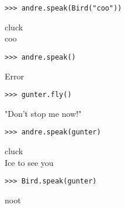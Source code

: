 \newpage
\begin{blocksection}
\vspace{9\baselineskip}
\begin{lstlisting}
>>> andre.speak(Bird("coo"))
\end{lstlisting}
\begin{solution}[.2in]
cluck \\
coo
\end{solution}

\vspace{3\baselineskip}
\begin{lstlisting}
>>> andre.speak()
\end{lstlisting}
\begin{solution}[.2in]
Error
\end{solution}

\vspace{3\baselineskip}
\begin{lstlisting}
>>> gunter.fly()
\end{lstlisting}
\begin{solution}[.2in]
"Don't stop me now!"
\end{solution}

\vspace{3\baselineskip}
\begin{lstlisting}
>>> andre.speak(gunter)
\end{lstlisting}
\begin{solution}[.2in]
cluck \\
Ice to see you
\end{solution}

\vspace{3\baselineskip}
\begin{lstlisting}
>>> Bird.speak(gunter)
\end{lstlisting}
\begin{solution}[.2in]
noot
\end{solution}

\end{blocksection}
\onecolumn

